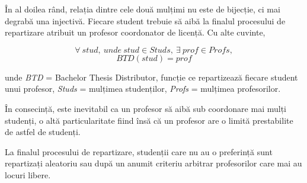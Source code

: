 În al doilea rând, relația dintre cele două mulțimi nu este de bijecție, ci mai degrabă una injectivă. Fiecare student trebuie să aibă la finalul procesului de repartizare atribuit un profesor coordonator de licență. Cu alte cuvinte,

\[\forall \: stud,\: unde\: stud \in Studs,\: \exists \: prof \in Profs,\] 
\[BTD(stud)=prof\]

unde \textit{BTD} = Bachelor Thesis Distributor, funcție ce repartizează fiecare student unui profesor, \textit{Studs} = mulțimea studenților, \textit{Profs} = mulțimea profesorilor.

În consecință, este inevitabil ca un profesor să aibă sub coordonare mai mulți studenți, o altă particularitate fiind însă că un profesor are o limită prestabilite de astfel de studenți.

La finalul procesului de repartizare, studenții care nu au o preferință sunt repartizați aleatoriu sau după un anumit criteriu arbitrar profesorilor care mai au locuri libere.
